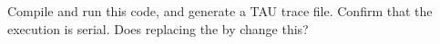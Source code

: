   Compile and run this code, and generate a TAU trace file. Confirm
  that the execution is serial. Does replacing the  by 
  change this?

